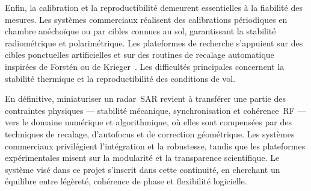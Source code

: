 Enfin, la calibration et la reproductibilité demeurent essentielles à la fiabilité des mesures. Les systèmes commerciaux réalisent des calibrations périodiques en chambre anéchoïque ou par cibles connues au sol, garantissant la stabilité radiométrique et polarimétrique. Les plateformes de recherche s’appuient sur des cibles ponctuelles artificielles et sur des routines de recalage automatique inspirées de Forstén ou de Krieger~\cite{Forsten2025,Krieger2010_InterferometricSAR}. Les difficultés principales concernent la stabilité thermique et la reproductibilité des conditions de vol.

En définitive, miniaturiser un radar~SAR revient à transférer une partie des contraintes physiques — stabilité mécanique, synchronisation et cohérence~RF — vers le domaine numérique et algorithmique, où elles sont compensées par des techniques de recalage, d’autofocus et de correction géométrique. Les systèmes commerciaux privilégient l’intégration et la robustesse, tandis que les plateformes expérimentales misent sur la modularité et la transparence scientifique. Le système visé dans ce projet s’inscrit dans cette continuité, en cherchant un équilibre entre légèreté, cohérence de phase et flexibilité logicielle.
